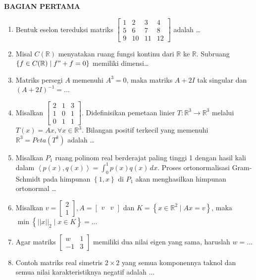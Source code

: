 \documentclass[12pt,twoside]{article}
\begin{document}
\textbf{BAGIAN PERTAMA}
\begin{enumerate}
	\item Bentuk eselon tereduksi matriks $\left[\begin{array}{cccc}
				      1 & 2 & 3 & 4 \\5&6&7&8\\9&10&11&12
			      \end{array}\right]$ adalah \dots

	\item Misal $C(\mathbb R)$ menyatakan ruang fungsi kontinu dari $\mathbb R$ ke $\mathbb{R}$. Subruang $\{f \in C(\mathbb{R})\mid f"+f=0\}$ memiliki dimensi\dots

	\item Matriks persegi $A$ memenuhi $A^3 = 0$, maka matriks $A+2I$ tak singular dan $(A+2I)^{-1} = \dots$

	\item Misalkan $\left[\begin{array}{ccc}
				      2 & 1 & 3 \\1&0&1\\0&1&1
			      \end{array}\right]$. Didefinisikan pemetaan linier $T : \mathbb{R}^3 \to \mathbb{R}^3$ melalui $T(x) = Ax, \forall x \in \mathbb{R}^3$. Bilangan positif terkecil yang memenuhi $\mathbb{R}^3 = Peta(T^k)$ adalah \dots

	\item Misalkan $P_1$ ruang polinom real berderajat paling tinggi 1 dengan hasil kali dalam $\left< p(x),q(x) \right> = \displaystyle\int_{0}^{1} p(x)q(x)\,dx$. Proses ortonormalisasi Gram-Schmidt pada himpunan $\left\lbrace 1,x \right\rbrace$ di $P_1$ akan menghasilkan himpunan ortonormal \dots

	\item Misalkan $v = \left[\begin{array}{c}
				      2 \\1
			      \end{array}\right], A = \left[\begin{array}{cc}
				      v & v
			      \end{array}\right]$ dan $K = \left\lbrace x \in \mathbb{R}^2 \mid Ax = v \right\rbrace$, maka  $\min\left\lbrace ||x||_2 \mid x \in K \right\rbrace = \dots$

	\item Agar matriks $\left[\begin{array}{cc}
				      w & 1 \\-1&3
			      \end{array}\right]$ memiliki dua nilai eigen yang sama, haruslah $w = \dots$

	\item Contoh matriks real simetris $2\times2$ yang semua komponennya taknol dan semua nilai karakteristiknya negatif adalah $\dots$
\end{enumerate}
\end{document}
